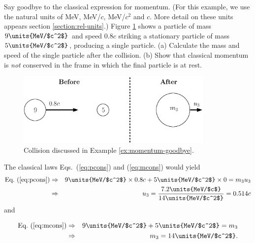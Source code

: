 \begin{example}{Say goodbye to the classical expression for momentum.}  
\label{ex:momentum-goodbye} 
(For this example, we use the natural units of MeV, MeV/$c$, MeV/$c^2$
and $c$.  More detail on these units appears section
\ref{section:rel-units}.)  Figure \ref{fig:momentum_goodbye} shows a
particle of mass $9\units{MeV/$c^2$}$ and speed $0.8c$ striking a
stationary particle of mass $5 \units{MeV/$c^2$}$, producing a
single particle.  (a) Calculate the mass and speed of the single
particle after the collision.  (b) Show that classical momentum is
{\em not} conserved in the frame in which the final particle is at
rest.
\begin{figure}[tb]
\begin{center}
\includegraphics[width=3.8in]{relativistic_momentum_and_energy/relpande1.eps}
\end{center}
\caption{Collision discussed in Example \ref{ex:momentum-goodbye}.
\label{fig:momentum_goodbye}}
\end{figure}
\solution
The classical laws Eqs.~(\ref{eq:pcons}) and (\ref{eq:mcons}) would
yield
\begin{eqnarray}
\text{Eq.~(\ref{eq:pcons})}&\Rightarrow& 9\units{MeV/$c^2$}\times 0.8c + 
                     5\units{MeV/$c^2$}\times 0 = m_3u_3 \nonumber \\
                 &\Rightarrow& u_3 = \frac{7.2\units{MeV/$c$}}
                            {14\units{MeV/$c^2$}} = 0.514c\nonumber
\end{eqnarray}
and 

\begin{eqnarray}
\text{Eq.~(\ref{eq:mcons})}
&\Rightarrow& 9\units{MeV/$c^2$} + 
                     5\units{MeV/$c^2$} = m_3 \nonumber \\
                    &\Rightarrow& m_3 = 14\units{MeV/$c^2$}. \nonumber
\end{eqnarray}


\end{example}

